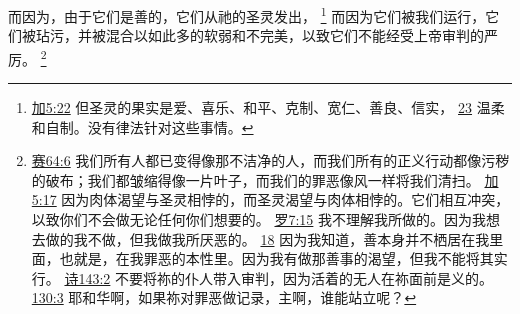 \documentclass[12pt, a4paper, oneside]{ctexart}
\begin{document}
	而因为，由于它们是善的，它们从祂的圣灵发出，
	\footnote {
		\href{https://biblehub.com/galatians/5-22.htm}{加5:22} 但圣灵的果实是爱、喜乐、和平、克制、宽仁、善良、信实，
		\href{https://biblehub.com/galatians/5-23.htm}{23} 温柔和自制。没有律法针对这些事情。
	}
	而因为它们被我们运行，它们被玷污，并被混合以如此多的软弱和不完美，以致它们不能经受上帝审判的严厉。
	\footnote {
		\href{https://biblehub.com/isaiah/64-6.htm}{赛64:6} 我们所有人都已变得像那不洁净的人，而我们所有的正义行动都像污秽的破布；我们都皱缩得像一片叶子，而我们的罪恶像风一样将我们清扫。
		\href{https://biblehub.com/galatians/5-17.htm}{加5:17} 因为肉体渴望与圣灵相悖的，而圣灵渴望与肉体相悖的。它们相互冲突，以致你们不会做无论任何你们想要的。
		\href{https://biblehub.com/romans/7-15.htm}{罗7:15} 我不理解我所做的。因为我想去做的我不做，但我做我所厌恶的。
		\href{https://biblehub.com/romans/7-18.htm}{18} 因为我知道，善本身并不栖居在我里面，也就是，在我罪恶的本性里。因为我有做那善事的渴望，但我不能将其实行。
		\href{https://biblehub.com/psalms/143-2.htm}{诗143:2} 不要将祢的仆人带入审判，因为活着的无人在祢面前是义的。
		\href{https://biblehub.com/psalms/130-3.htm}{130:3} 耶和华啊，如果祢对罪恶做记录，主啊，谁能站立呢？
	}
\end{document}
